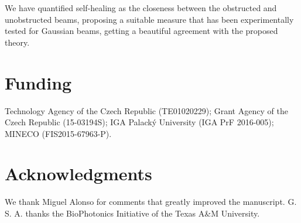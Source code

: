 \documentclass[10pt]{article}
\newcommand{\sugg}[1]{{#1}}
\begin{document}
  \sugg{We have quantified self-healing as the closeness between the
  obstructed and unobstructed beams, proposing a suitable measure that
  has been experimentally tested for Gaussian beams, getting a
  beautiful agreement with the proposed theory.}


\section*{Funding}
Technology Agency of the Czech Republic (TE01020229);  
Grant Agency of the Czech Republic (15-03194S); 
IGA Palack{\'y} University (IGA PrF 2016-005); 
MINECO (FIS2015-67963-P).


\section*{Acknowledgments}
We thank Miguel Alonso  for comments that greatly improved the
manuscript.
G. S. A. thanks the BioPhotonics Initiative of the Texas A\&M
University.
\end{document}
